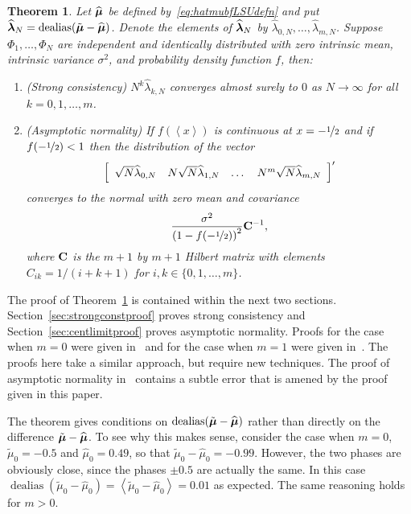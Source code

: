 \documentclass[aap]{imsart}
\newcommand{\dealias}{\operatorname{dealias}}
\newcommand{\fracpart}[1]{\left\langle #1 \right\rangle}
\newtheorem{theorem}{Theorem}
\begin{document}
\begin{theorem} \label{thm:asymp_proof} 
Let $\widehat{\boldsymbol{\mu}}$ be defined by~\eqref{eq:hatmubfLSUdefn} and put $\widehat{\lambdabf}_N = \dealias(\tilde{\mubf} - \widehat{\mubf})$.  Denote the elements of $\widehat{\boldsymbol{\lambda}}_N$ by $\widehat{\lambda}_{0,N}, \dots, \widehat{\lambda}_{m,N}$.  Suppose $\Phi_1, \dots, \Phi_N$ are independent and identically distributed with zero intrinsic mean, intrinsic variance $\sigma^2$, and probability density function $f$, then: 
\begin{enumerate}
\item (Strong consistency) $N^k \widehat{\lambda}_{k,N}$ converges almost surely to $0$ as $N\rightarrow\infty$ for all $k = 0, 1, \dots, m$.
\item (Asymptotic normality) If $f(\fracpart{x})$ is continuous at $x = -\nicefrac{1}{2}$ and if $f(-\nicefrac{1}{2}) < 1$ then the distribution of the vector
\[
\left[
\begin{array}
[c]{cccc}%
\sqrt{N} \widehat{\lambda}_{0,N} & N \sqrt{N}\widehat{\lambda}_{1,N}  & \dots & N^m\sqrt{N} \widehat{\lambda}_{m,N}
\end{array}
\right]^\prime
\]
converges to the normal with zero mean and covariance
\[
\frac{\sigma^2}{\left(1-f( -\nicefrac{1}{2}) \right)^{2}} \mathbf{C}^{-1},
\]
where $\mathbf{C}$ is the $m+1$ by $m+1$ Hilbert matrix with elements $C_{ik} = 1/(i + k + 1)$ for $i,k \in \{0, 1, \dots, m\}$.
\end{enumerate}
\end{theorem}
The proof of Theorem~\ref{thm:asymp_proof} is contained within the next two sections. Section~\ref{sec:strongconstproof} proves strong consistency and Section~\ref{sec:centlimitproof} proves asymptotic normality.  Proofs for the case when $m=0$ were given in~\cite{McKilliam_mean_dir_est_sq_arc_length2010} and for the case when $m=1$ were given in~\cite{McKilliamFrequencyEstimationByPhaseUnwrapping2009}.  The proofs here take a similar approach, but require new techniques.  The proof of asymptotic normality in~\cite{McKilliamFrequencyEstimationByPhaseUnwrapping2009} contains a subtle error that is amened by the proof given in this paper.

The theorem gives conditions on $\dealias(\tilde{\mubf} - \widehat{\mubf})$ rather than directly on the difference $\tilde{\boldsymbol{\mu}} - \widehat{\boldsymbol{\mu}}$.   To see why this makes sense, consider the case when $m=0$, $\tilde{\mu}_0 = -0.5$ and $\widehat{\mu}_0 = 0.49$, so that $\tilde{\mu}_0 - \widehat{\mu}_0 = -0.99$.  However, the two phases are obviously close, since the phases $\pm 0.5$ are actually the same.  In this case $\dealias(\tilde{\mu}_0 - \widehat{\mu}_0) = \fracpart{\tilde{\mu}_0 - \widehat{\mu}_0} = 0.01$ as expected.  The same reasoning holds for $m > 0$.
\end{document}
